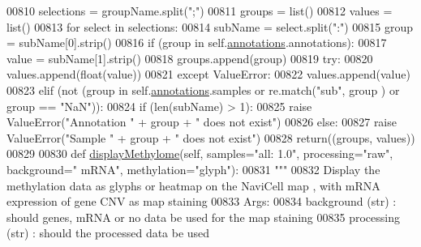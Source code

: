 \begin{DoxyCode}
00810         selections = groupName.split(\textcolor{stringliteral}{";"})
00811         groups = list()
00812         values = list()
00813         \textcolor{keywordflow}{for} select \textcolor{keywordflow}{in} selections:
00814             subName = select.split(\textcolor{stringliteral}{":"})
00815             group = subName[0].strip()
00816             \textcolor{keywordflow}{if} (group \textcolor{keywordflow}{in} self.\hyperlink{classnavicom_1_1navicom_1_1NaviCom_a0386d881214943cf3432d0ffe22cbb71}{annotations}.annotations):
00817                 value = subName[1].strip()
00818                 groups.append(group)
00819                 \textcolor{keywordflow}{try}:
00820                     values.append(float(value))
00821                 \textcolor{keywordflow}{except} ValueError:
00822                     values.append(value)
00823             \textcolor{keywordflow}{elif} (\textcolor{keywordflow}{not} (group \textcolor{keywordflow}{in} self.\hyperlink{classnavicom_1_1navicom_1_1NaviCom_a0386d881214943cf3432d0ffe22cbb71}{annotations}.samples \textcolor{keywordflow}{or} re.match(\textcolor{stringliteral}{"sub"}, group
      ) \textcolor{keywordflow}{or} group == \textcolor{stringliteral}{"NaN"})):
00824                 \textcolor{keywordflow}{if} (len(subName) > 1):
00825                     \textcolor{keywordflow}{raise} ValueError(\textcolor{stringliteral}{"Annotation "} + group + \textcolor{stringliteral}{" does not exist"})
00826                 \textcolor{keywordflow}{else}:
00827                     \textcolor{keywordflow}{raise} ValueError(\textcolor{stringliteral}{"Sample "} + group + \textcolor{stringliteral}{" does not exist"})
00828         \textcolor{keywordflow}{return}((groups, values))
00829 
00830     \textcolor{keyword}{def }\hyperlink{classnavicom_1_1navicom_1_1NaviCom_a018f936de625af8a5dd7e8250ede6483}{displayMethylome}(self, samples="all: 1.0\textcolor{stringliteral}{", processing="}raw\textcolor{stringliteral}{", background="
      }mRNA\textcolor{stringliteral}{", methylation="}glyph\textcolor{stringliteral}{"):}
00831 \textcolor{stringliteral}{        }\textcolor{stringliteral}{"""}
00832 \textcolor{stringliteral}{            Display the methylation data as glyphs or heatmap on the NaviCell map
      , with mRNA expression of gene CNV as map staining}
00833 \textcolor{stringliteral}{            Args:}
00834 \textcolor{stringliteral}{                background (str) : should genes, mRNA or no data be used for the 
      map staining}
00835 \textcolor{stringliteral}{                processing (str) : should the processed data be used}

\end{DoxyCode}
